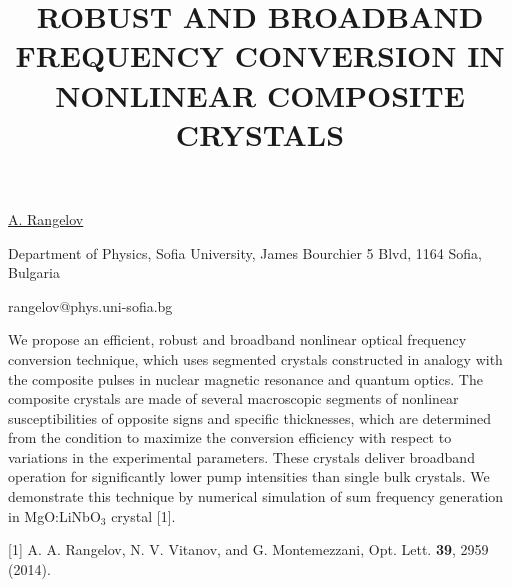 \title{ROBUST AND BROADBAND FREQUENCY CONVERSION IN NONLINEAR COMPOSITE CRYSTALS}

\underline{A. Rangelov} 

{\normalsize{\vspace{-4mm}
Department of Physics, Sofia University, James Bourchier 5 Blvd, 1164 Sofia, Bulgaria

\email rangelov@phys.uni-sofia.bg}}

We propose an efficient, robust and broadband nonlinear optical frequency conversion technique, which uses segmented crystals constructed in analogy with the composite pulses in nuclear magnetic resonance and quantum optics.
The composite crystals are made of several macroscopic segments of nonlinear susceptibilities of opposite signs and specific thicknesses, which are determined from the condition to maximize the conversion efficiency with respect to variations in the experimental parameters.
These crystals deliver broadband operation for significantly lower pump intensities than single bulk crystals.
We demonstrate this technique by numerical simulation of sum frequency generation in MgO:LiNbO$_{3}$ crystal [1].

{\normalsize
[1] A. A. Rangelov, N. V. Vitanov, and G. Montemezzani, Opt. Lett. \textbf{39}, 2959 (2014).
}

\vspace{\baselineskip}
